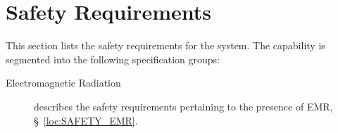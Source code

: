 \KNEADSECTIONNEWPAGE
\section{Safety Requirements}
\label{lab:sec_Safety}


This section lists the safety requirements for the system. The \ThisSys capability is segmented into the following specification groups:

\begin{description}
	\item [Electromagnetic Radiation] describes the safety requirements pertaining to the presence of EMR, \S~\ref{loc:SAFETY_EMR}.
\end{description}


% 

